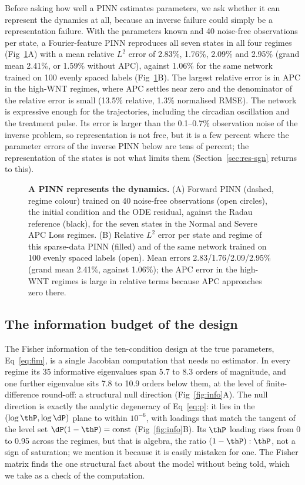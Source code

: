 Before asking how well a PINN estimates parameters, we ask whether it can
represent the dynamics at all, because an inverse failure could simply be a
representation failure. With the parameters known and 40 noise-free observations
per state, a Fourier-feature PINN reproduces all seven states in all four regimes
(Fig~\ref{fig:forward}A) with a mean relative $L^2$ error of 2.83\%, 1.76\%,
2.09\% and 2.95\% (grand mean 2.41\%, or 1.59\% without APC), against 1.06\% for
the same network trained on 100 evenly spaced labels (Fig~\ref{fig:forward}B).
The largest relative error is in APC in the high-WNT regimes, where APC settles
near zero and the denominator of the relative error is small (13.5\% relative,
1.3\% normalised RMSE). The network is expressive enough for the trajectories,
including the circadian oscillation and the treatment pulse. Its error is
larger than the 0.1--0.7\% observation noise of the inverse problem, so
representation is not free, but it is a few percent where the parameter errors
of the inverse PINN below are tens of percent; the representation of the states
is not what limits them (Section~\ref{sec:res-sgn} returns to this).

\begin{figure}[tbp]
\centering
{}
\caption{\textbf{A PINN represents the dynamics.} (A) Forward PINN (dashed,
regime colour) trained on 40 noise-free observations (open circles), the initial
condition and the ODE residual, against the Radau reference (black), for the
seven states in the Normal and Severe APC Loss regimes. (B) Relative $L^2$
error per state and regime of this sparse-data PINN (filled) and of the same
network trained on 100 evenly spaced labels (open). Mean errors 2.83/1.76/2.09/2.95\%
(grand mean 2.41\%, against 1.06\%); the APC error in the high-WNT regimes is
large in relative terms because APC approaches zero there.}
\label{fig:forward}
\end{figure}

\subsection{The information budget of the design}
\label{sec:res-budget}

The Fisher information of the ten-condition design at the true parameters,
Eq~\eqref{eq:fim}, is a single Jacobian computation that needs no estimator.
In every regime its 35 informative eigenvalues span 5.7 to 8.3 orders of
magnitude, and one further eigenvalue sits 7.8 to 10.9 orders below them, at the
level of finite-difference round-off: a structural null
direction (Fig~\ref{fig:info}A). The null direction is exactly
the analytic degeneracy of Eq~\eqref{eq:p}: it lies in the $(\log\thP,\log\dP)$
plane to within $10^{-6}$, with loadings that match the tangent of the level
set $\dP(1-\thP)=\text{const}$ (Fig~\ref{fig:info}B). Its $\thP$ loading rises
from 0 to 0.95 across the regimes, but that is algebra, the ratio
$(1-\thP):\thP$, not a sign of saturation; we mention it because it is easily
mistaken for one. The Fisher matrix finds the one structural fact about the
model without being told, which we take as a check of the computation.

